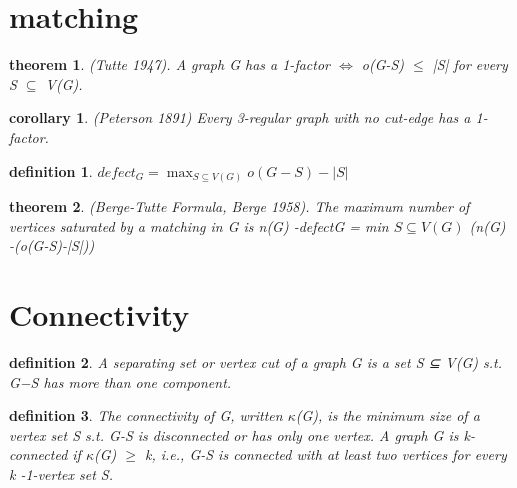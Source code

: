 \documentclass[twocolumn]{article}
\title{}
\newtheorem{theorem}{theorem}[section]  %
\newtheorem{definition}{definition}
\newtheorem{corollary}{corollary}
\begin{document}
\begin{CJK*}{UTF8}{bkai}


\section{matching}
    \begin{theorem}
     (Tutte 1947). A graph G has a 1-factor $\iff$ 
     o(G-S) $\leq$ |S| for every S $\subseteq $ V(G).
    \end{theorem}

    \begin{corollary}
       (Peterson 1891) Every 3-regular graph with no cut-edge has a 1-factor.  
    \end{corollary}

    \begin{definition}
        $defect_{G} = \max _{S \subseteq V(G)} o(G-S)-|S|$
    \end{definition}

    \begin{theorem}
        (Berge-Tutte Formula, Berge 1958). The maximum number of vertices saturated by a matching in G is
 n(G) -defectG = min
 $S \subseteq V(G)$
 (n(G) -(o(G-S)-|S|))
    \end{theorem}

\section{Connectivity}

    \begin{definition}{}
         A separating set or vertex cut of a graph G is a set S ⊆ V(G) s.t. G−S has
 more than one component.
    \end{definition}

    \begin{definition}
         The connectivity of G, written $\kappa$(G), is the minimum size of a vertex set S s.t.
 G-S is disconnected or has only one vertex. A graph G is k-connected if
 $\kappa$(G) $\geq$ k, i.e., G-S is connected with at least two vertices for every
 k -1-vertex set S.
    \end{definition}


\end{CJK*}
\end{document}
